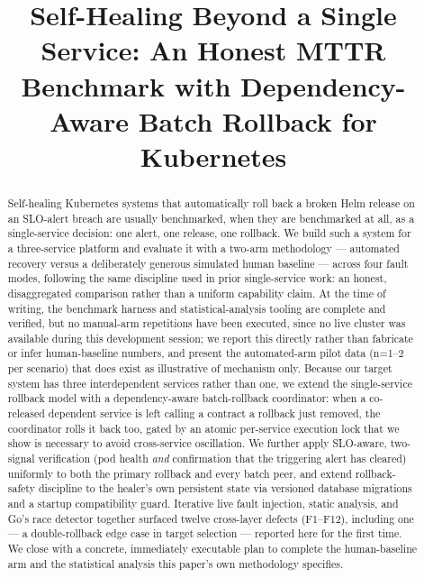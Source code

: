 \documentclass[conference]{IEEEtran}
\begin{document}
\title{Self-Healing Beyond a Single Service: An Honest MTTR Benchmark with Dependency-Aware Batch Rollback for Kubernetes}

\author{
}

\maketitle

\begin{abstract}
Self-healing Kubernetes systems that automatically roll back a broken Helm release on an SLO-alert breach are usually benchmarked, when they are benchmarked at all, as a single-service decision: one alert, one release, one rollback. We build such a system for a three-service platform and evaluate it with a two-arm methodology --- automated recovery versus a deliberately generous simulated human baseline --- across four fault modes, following the same discipline used in prior single-service work: an honest, disaggregated comparison rather than a uniform capability claim. At the time of writing, the benchmark harness and statistical-analysis tooling are complete and verified, but no manual-arm repetitions have been executed, since no live cluster was available during this development session; we report this directly rather than fabricate or infer human-baseline numbers, and present the automated-arm pilot data (n=1--2 per scenario) that does exist as illustrative of mechanism only. Because our target system has three interdependent services rather than one, we extend the single-service rollback model with a dependency-aware batch-rollback coordinator: when a co-released dependent service is left calling a contract a rollback just removed, the coordinator rolls it back too, gated by an atomic per-service execution lock that we show is necessary to avoid cross-service oscillation. We further apply SLO-aware, two-signal verification (pod health \emph{and} confirmation that the triggering alert has cleared) uniformly to both the primary rollback and every batch peer, and extend rollback-safety discipline to the healer's own persistent state via versioned database migrations and a startup compatibility guard. Iterative live fault injection, static analysis, and Go's race detector together surfaced twelve cross-layer defects (F1--F12), including one --- a double-rollback edge case in target selection --- reported here for the first time. We close with a concrete, immediately executable plan to complete the human-baseline arm and the statistical analysis this paper's own methodology specifies.
\end{abstract}
\end{document}
